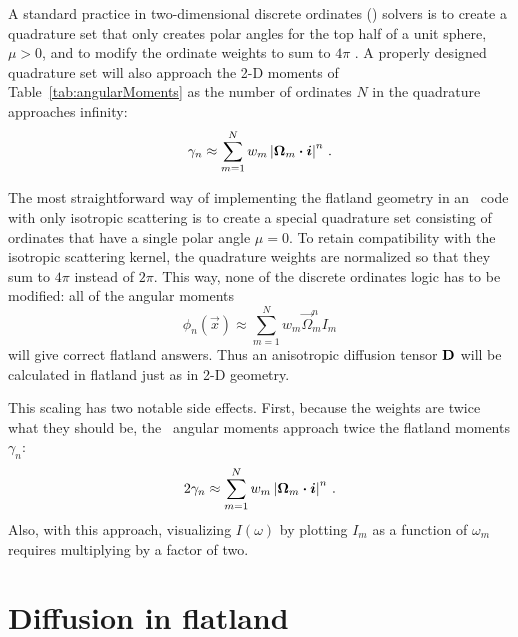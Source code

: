 A standard practice in two-dimensional discrete ordinates (\SN) solvers is to
create a quadrature set that only creates polar angles for the top half of a
unit sphere, $\mu>0$, and to modify the ordinate weights to sum to $4\pi$
\cite{Zik1997}. A properly designed quadrature set will also approach the 2-D
moments of Table~\ref{tab:angularMoments} as the number of ordinates
$N$ in the quadrature approaches infinity:
\begin{equation*}
  \gamma_n \approx \sum_{m=1}^{N} w_m \left|  \bm{\Omega}_m \bm{\cdot} \bm{i} \right|^n \,.
\end{equation*}

The most straightforward way of implementing the flatland geometry in an \SN\
code with only isotropic scattering is to create a special quadrature set
consisting of ordinates that have a single
polar angle $\mu=0$. To retain compatibility with the isotropic scattering
kernel, the quadrature weights are normalized so that they sum to $4\pi$
instead of $2\pi$. This way, none of the discrete ordinates logic has to be
modified: all of the angular moments
\begin{equation*}
  \phi_n(\vec{x}) \approx \sum_{m=1}^{N} w_m \vec{\Omega}_m^n I_m
\end{equation*}
will give correct flatland answers. Thus an anisotropic diffusion tensor $\mathbf{D}$
will be calculated in flatland just as in 2-D geometry.

This scaling has two notable side effects. First, because the weights are twice
what they should be, the \SN\ angular moments approach twice the flatland
moments $\gamma_n$:
\begin{equation*}
  2 \gamma_n \approx \sum_{m=1}^{N} w_m \left|  \bm{\Omega}_m \bm{\cdot} \bm{i} \right|^n \,.
\end{equation*}
Also, with this approach, visualizing $I(\omega)$ by plotting
$I_m$ as a function of $\omega_m$ requires multiplying by a factor of two.

\section{Diffusion in flatland}


